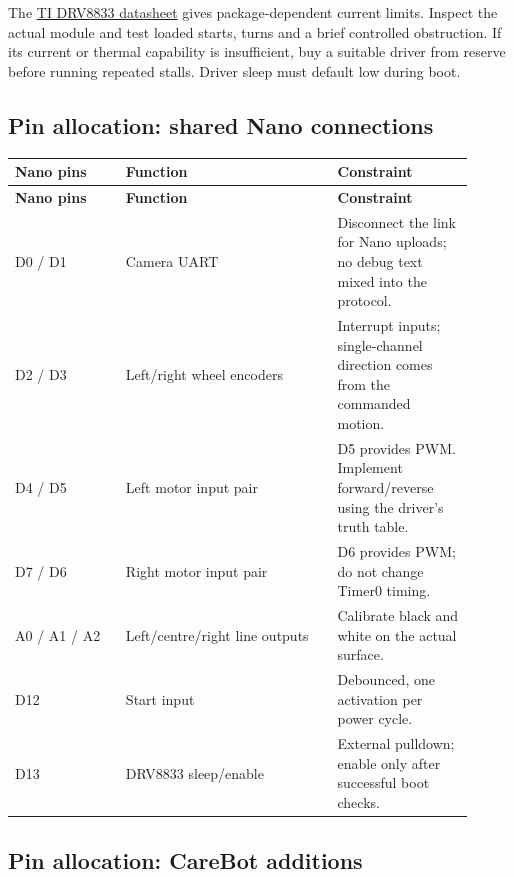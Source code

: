 \documentclass[10pt,a4paper]{article}
\begin{document}
The \href{https://www.ti.com/lit/ds/symlink/drv8833.pdf}{TI DRV8833 datasheet} gives package-dependent current limits. Inspect the actual module and test loaded starts, turns and a brief controlled obstruction. If its current or thermal capability is insufficient, buy a suitable driver from reserve before running repeated stalls. Driver sleep must default low during boot.

\subsection{Pin allocation: shared Nano connections}
\small\begin{longtable}{@{}>{\raggedright\arraybackslash}p{0.22\linewidth}>{\raggedright\arraybackslash}p{0.42\linewidth}>{\raggedright\arraybackslash}p{0.27\linewidth}@{}}
\toprule
\textbf{Nano pins} & \textbf{Function} & \textbf{Constraint} \\
\midrule\endfirsthead
\toprule\textbf{Nano pins} & \textbf{Function} & \textbf{Constraint} \\\midrule\endhead
D0 / D1 & Camera UART & Disconnect the link for Nano uploads; no debug text mixed into the protocol. \\[3pt]
D2 / D3 & Left/right wheel encoders & Interrupt inputs; single-channel direction comes from the commanded motion. \\[3pt]
D4 / D5 & Left motor input pair & D5 provides PWM. Implement forward/reverse using the driver's truth table. \\[3pt]
D7 / D6 & Right motor input pair & D6 provides PWM; do not change Timer0 timing. \\[3pt]
A0 / A1 / A2 & Left/centre/right line outputs & Calibrate black and white on the actual surface. \\[3pt]
D12 & Start input & Debounced, one activation per power cycle. \\[3pt]
D13 & DRV8833 sleep/enable & External pulldown; enable only after successful boot checks. \\[3pt]
\bottomrule\end{longtable}\normalsize
{}\subsection{Pin allocation: CareBot additions}
\end{document}
